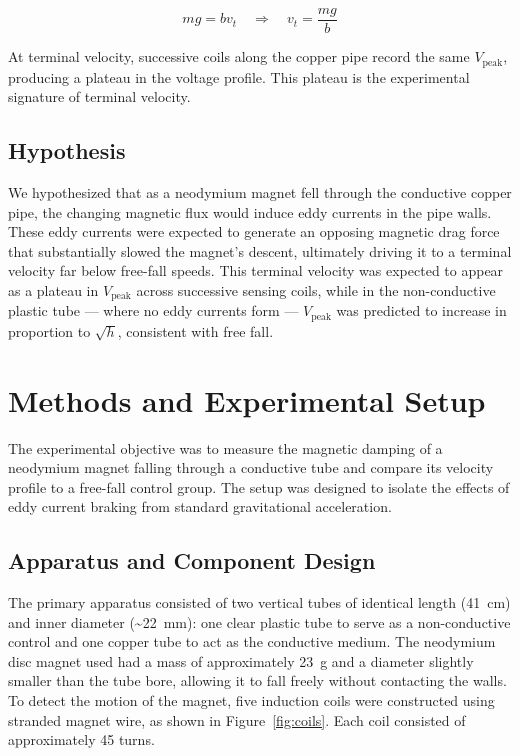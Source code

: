 \documentclass[11pt]{article}
\begin{document}
\begin{equation}
    mg = bv_t \quad \Longrightarrow \quad v_t = \frac{mg}{b}
    \label{eq:terminal}
\end{equation}

\noindent At terminal velocity, successive coils along the copper pipe record the same
$V_\text{peak}$, producing a plateau in the voltage profile. This plateau is the experimental
signature of terminal velocity.

\subsection*{Hypothesis}

We hypothesized that as a neodymium magnet fell through the conductive copper pipe, the
changing magnetic flux would induce eddy currents in the pipe walls. These eddy currents were
expected to generate an opposing magnetic drag force that substantially slowed the magnet's
descent, ultimately driving it to a terminal velocity far below free-fall speeds. This terminal
velocity was expected to appear as a plateau in $V_\text{peak}$ across successive sensing coils,
while in the non-conductive plastic tube --- where no eddy currents form --- $V_\text{peak}$ was
predicted to increase in proportion to $\sqrt{h}$, consistent with free fall.

\section{Methods and Experimental Setup}
\label{sec:methods}

The experimental objective was to measure the magnetic damping of a neodymium magnet
falling through a conductive tube and compare its velocity profile to a free-fall control
group. The setup was designed to isolate the effects of eddy current braking from standard
gravitational acceleration.

\subsection{Apparatus and Component Design}

The primary apparatus consisted of two vertical tubes of identical length (41~cm) and inner
diameter (\textasciitilde22~mm): one clear plastic tube to serve as a non-conductive control
and one copper tube to act as the conductive medium. The neodymium disc magnet used had a
mass of approximately 23~g and a diameter slightly smaller than the tube bore, allowing it to
fall freely without contacting the walls. To detect the motion of the magnet, five induction
coils were constructed using stranded magnet wire, as shown in Figure~\ref{fig:coils}. Each
coil consisted of approximately 45 turns.
\end{document}
